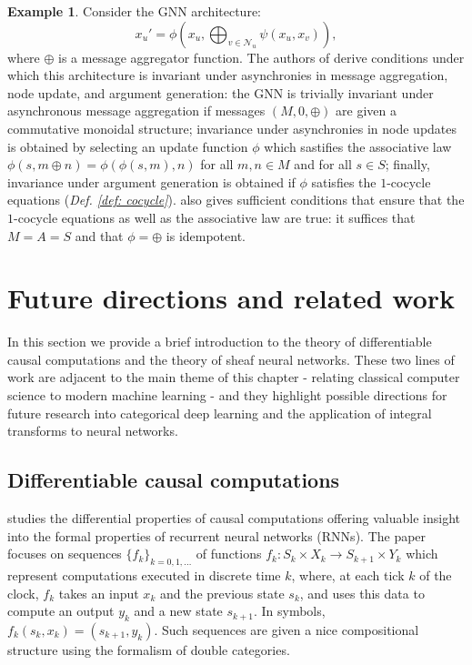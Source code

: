 \documentclass[11pt,a4paper,openright,twoside]{report}
\newcounter{mycounter}
\theoremstyle{plain}
\theoremstyle{definition}
\newtheorem{example}[mycounter]{Example}
\begin{document}
\begin{example}
  Consider the GNN architecture:
  \[x_u' = \phi\left(x_u, \bigoplus_{v \in \mathcal{N}_u}\psi(x_{u},x_{v})\right),\]
  where $\oplus$ is a message aggregator function. The authors of \cite{dudzik2024asynchronous} derive conditions under which this architecture is invariant under asynchronies in message aggregation, node update, and argument generation: the GNN is trivially invariant under asynchronous message aggregation if messages $(M,0,\oplus)$ are given a commutative monoidal structure; invariance under asynchronies in node updates is obtained by selecting an update function $\phi$ which sastifies the associative law $\phi(s,m \oplus n) = \phi(\phi(s,m),n)$ for all $m,n \in M$ and for all $s \in S$; finally, invariance under argument generation is obtained if $\phi$ satisfies the $1$-cocycle equations (\textit{Def. \ref{def: cocycle}}). \cite{dudzik2024asynchronous} also gives sufficient conditions that ensure that the $1$-cocycle equations as well as the associative law are true: it suffices that $M=A=S$ and that $\phi=\oplus$ is idempotent.
\end{example}




\section{Future directions and related work}

In this section we provide a brief introduction to the theory of differentiable causal computations and the theory of sheaf neural networks. These two lines of work are adjacent to the main theme of this chapter - relating classical computer science to modern machine learning - and they highlight possible directions for future research into categorical deep learning and the application of integral transforms to neural networks.

\subsection{Differentiable causal computations}

\cite{sprunger2019differentiable} studies the differential properties of causal computations offering valuable insight into the formal properties of recurrent neural networks (RNNs). The paper focuses on sequences $\{f_k\}_{k=0,1,\dots}$ of functions $f_k: S_k \times X_k \to S_{k+1} \times Y_k$ which represent computations executed in discrete time $k$, where, at each tick $k$ of the clock, $f_k$ takes an input $x_k$ and the previous state $s_k$, and uses this data to compute an output $y_k$ and a new state $s_{k+1}$. In symbols, $f_k(s_k,x_k) = (s_{k+1},y_k)$. Such sequences are given a nice compositional structure using the formalism of double categories.
\end{document}
